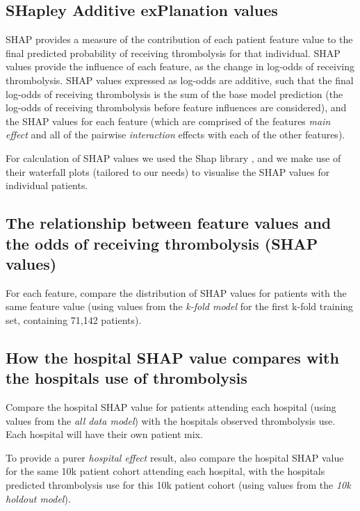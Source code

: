 \subsection{SHapley Additive exPlanation values}
SHAP provides a measure of the contribution of each patient feature value to the final predicted probability of receiving thrombolysis for that individual. SHAP values provide the influence of each feature, as the change in log-odds of receiving thrombolysis. SHAP values expressed as log-odds are additive, such that the final log-odds of receiving thrombolysis is the sum of the base model prediction (the log-odds of receiving thrombolysis before feature influences are considered), and the SHAP values for each feature (which are comprised of the features \emph{main effect} and all of the pairwise \emph{interaction} effects with each of the other features). 

For calculation of SHAP values we used the Shap library \cite{lundberg_unified_2017}, and we make use of their waterfall plots (tailored to our needs) to visualise the SHAP values for individual patients.

\subsection{The relationship between feature values and the odds of receiving thrombolysis (SHAP values)}

For each feature, compare the distribution of SHAP values for patients with the same feature value (using values from the \emph{k-fold model} for the first k-fold training set, containing 71,142 patients).



\subsection{How the hospital SHAP value compares with the hospitals use of thrombolysis}

Compare the hospital SHAP value for patients attending each hospital (using values from the \emph{all data model}) with the hospitals observed thrombolysis use. Each hospital will have their own patient mix.

To provide a purer \emph{hospital effect} result, also compare the hospital SHAP value for the same 10k patient cohort attending each hospital, with the hospitals predicted thrombolysis use for this 10k patient cohort (using values from the \emph{10k holdout model}).

